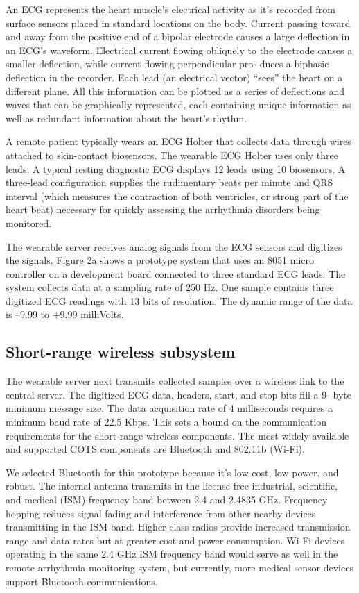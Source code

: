 \documentclass[a4paper,12pt]{article}
\begin{document}
An ECG represents the heart muscle’s electrical activity as it’s recorded from surface sensors placed in standard locations on the body. Current passing toward and away from the positive end of a bipolar electrode causes a large deflection in an ECG’s waveform. Electrical current flowing obliquely to the electrode causes a smaller deflection, while current flowing perpendicular pro- duces a biphasic deflection in the recorder. Each lead (an electrical vector) “sees” the heart on a different plane. All this information can be plotted as a series of deflections and waves that can be graphically represented, each containing unique information as well as redundant information about the heart’s rhythm.

A remote patient typically wears an ECG Holter that collects data through wires attached to skin-contact biosensors. The wearable ECG Holter uses only three leads. A typical resting diagnostic ECG displays 12 leads using 10 biosensors. A three-lead configuration supplies the rudimentary beats per minute and QRS interval (which measures the contraction of both ventricles, or strong part of the heart beat) necessary for quickly assessing the arrhythmia disorders being monitored.

The wearable server receives analog signals from the ECG sensors and digitizes the signals. Figure 2a shows a prototype system that uses an 8051 micro controller on a development board connected to three standard ECG leads. The system collects data at a sampling rate of 250 Hz. One sample contains three digitized ECG readings with 13 bits of resolution. The dynamic range of the data is –9.99 to +9.99 milliVolts.

\subsection{Short-range wireless subsystem}


The wearable server next transmits collected samples over a wireless link to the central server. The digitized ECG data, headers, start, and stop bits fill a 9- byte minimum message size. The data acquisition rate of 4 milliseconds requires a minimum baud rate of 22.5 Kbps. This sets a bound on the communication requirements for the short-range wireless components. The most widely available and supported COTS components are Bluetooth and 802.11b (Wi-Fi).

We selected Bluetooth for this prototype because it’s low cost, low power, and robust. The internal antenna transmits in the license-free industrial, scientific, and medical (ISM) frequency band between 2.4 and 2.4835 GHz. Frequency hopping reduces signal fading and interference from other nearby devices transmitting in the ISM band. Higher-class radios provide increased transmission range and data rates but at greater cost and power consumption. Wi-Fi devices operating in the same 2.4 GHz ISM frequency band would serve as well in the remote arrhythmia monitoring system, but currently, more medical sensor devices support Bluetooth communications.
\end{document}
